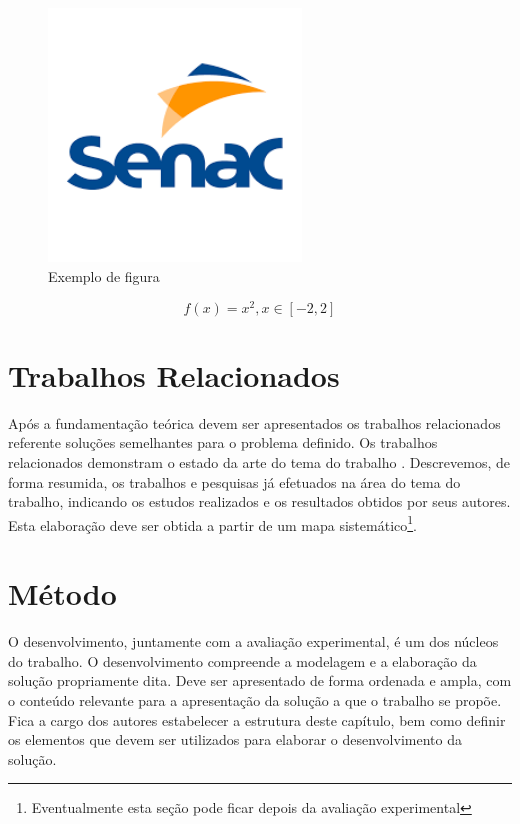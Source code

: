 \documentclass[12pt]{tcc}
\begin{document}
\begin{figure}[!ht]
	\centering
	\includegraphics[width=0.6\textwidth]{figures/figura.png}
	\caption{Exemplo de figura}
	\label{fig:exemplo}
\end{figure}	

\begin{equation}
	\label{eq:exemplo}
	f(x) = x^2, x \in [-2,2]
\end{equation}

\chapter{Trabalhos Relacionados}
\label{sec:trabalhos_relacionados}
	\label{sec:trab_relacionados}

Após a fundamentação teórica devem ser apresentados os trabalhos relacionados referente soluções semelhantes para o problema definido. Os trabalhos relacionados demonstram o estado da arte do tema do trabalho \citep{wazlawick_metodologia_2017}. Descrevemos, de forma resumida, os trabalhos e pesquisas já efetuados na área do tema do trabalho, indicando os estudos realizados e os resultados obtidos por seus autores. Esta elaboração deve ser obtida a partir de um mapa sistemático\footnote{Eventualmente esta seção pode ficar depois da avaliação experimental}. 

\chapter{Método} 
	\label{sec:metodologia}

O desenvolvimento, juntamente com a avaliação experimental, é um dos núcleos do trabalho. O desenvolvimento compreende a modelagem e a elaboração da solução propriamente dita. Deve ser apresentado de forma ordenada e ampla, com o conteúdo relevante para a apresentação da solução a que o trabalho se propõe. Fica a cargo dos autores estabelecer a estrutura deste capítulo, bem como definir os elementos que devem ser utilizados para elaborar o desenvolvimento da solução. 
\end{document}
